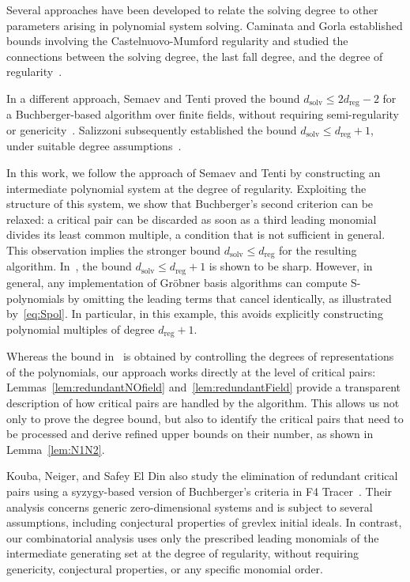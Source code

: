 \documentclass[a4paper, 12pt, oneside, openright]{article}
\begin{document}
Several approaches have been developed to relate the solving degree to other parameters arising in polynomial system solving. 
Caminata and Gorla established bounds involving the Castelnuovo-Mumford regularity and studied the connections between the solving degree, the last fall degree, and the degree of regularity~\cite{CG21,CG23}.

In a different approach, Semaev and Tenti proved the bound $d_{\mathrm{solv}}\le 2d_{\mathrm{reg}}-2$ for a Buchberger-based algorithm over finite fields, without requiring semi-regularity or genericity~\cite{ST}.
Salizzoni subsequently established the bound $d_{\mathrm{solv}}\le d_{\mathrm{reg}}+1$, under suitable degree assumptions~\cite{S25}. 

In this work, we follow the approach of Semaev and Tenti by constructing an intermediate polynomial system at the degree of regularity. Exploiting the structure of this system, we show that Buchberger's second criterion can be relaxed: a critical pair can be discarded as soon as a third leading monomial divides its least common multiple, a condition that is not sufficient in general. This observation implies the stronger bound $d_{\mathrm{solv}}\le d_{\mathrm{reg}}$ for the resulting algorithm.
In~\cite[Example 3.9]{S25}, the bound $d_{\mathrm{solv}}\le d_{\mathrm{reg}}+1$ is shown to be sharp. However, in general, any implementation of Gr\"obner basis algorithms can compute S-polynomials by omitting the leading terms that cancel identically, as illustrated by~\eqref{eq:Spol}. In particular, in this example, this avoids explicitly constructing polynomial multiples of degree $d_{\mathrm{reg}}+1$.

Whereas the bound in~\cite{S25} is obtained by controlling the degrees of representations of the polynomials, our approach works directly at the level of critical pairs: Lemmas~\ref{lem:redundantNOfield} and~\ref{lem:redundantField} provide a transparent description of how critical pairs are handled by the algorithm.  This allows us not only to prove the degree bound, but also to identify the critical pairs that need to be processed and derive refined upper bounds on their number, as shown in Lemma~\ref{lem:N1N2}.

Kouba, Neiger, and Safey El Din also study the elimination of redundant critical pairs using a syzygy-based version of Buchberger's criteria in F4 Tracer~\cite{F4Tracer}. Their analysis concerns generic zero-dimensional systems and is subject to several assumptions, including conjectural properties of grevlex initial ideals. In contrast, our combinatorial analysis uses only the prescribed leading monomials of the intermediate generating set at the degree of regularity, without requiring genericity, conjectural properties, or any specific monomial order.
\end{document}
